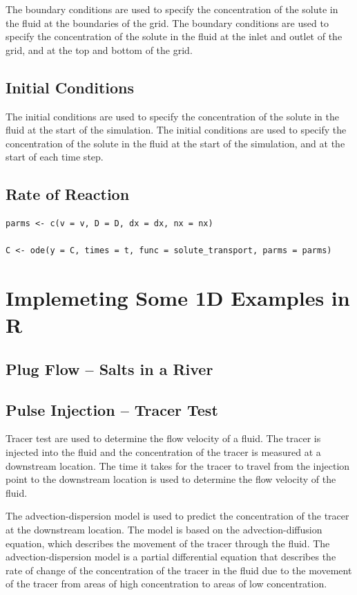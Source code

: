 \documentclass{tufte-handout}\usepackage[]{graphicx}\usepackage[]{xcolor}
\begin{document}
The boundary conditions are used to specify the concentration of the solute in the fluid at the boundaries of the grid. The boundary conditions are used to specify the concentration of the solute in the fluid at the inlet and outlet of the grid, and at the top and bottom of the grid.

\subsection{Initial Conditions}

The initial conditions are used to specify the concentration of the solute in the fluid at the start of the simulation. The initial conditions are used to specify the concentration of the solute in the fluid at the start of the simulation, and at the start of each time step.



\subsection{Rate of Reaction}



\begin{verbatim}
parms <- c(v = v, D = D, dx = dx, nx = nx)

C <- ode(y = C, times = t, func = solute_transport, parms = parms)
\end{verbatim}


\section{Implemeting Some 1D Examples in R}

\subsection{Plug Flow  -- Salts in a River}

\subsection{Pulse Injection -- Tracer Test}

Tracer test are used to determine the flow velocity of a fluid. The tracer is injected into the fluid and the concentration of the tracer is measured at a downstream location. The time it takes for the tracer to travel from the injection point to the downstream location is used to determine the flow velocity of the fluid.

The advection-dispersion model is used to predict the concentration of the tracer at the downstream location. The model is based on the advection-diffusion equation, which describes the movement of the tracer through the fluid. The advection-dispersion model is a partial differential equation that describes the rate of change of the concentration of the tracer in the fluid due to the movement of the tracer from areas of high concentration to areas of low concentration.
\end{document}
